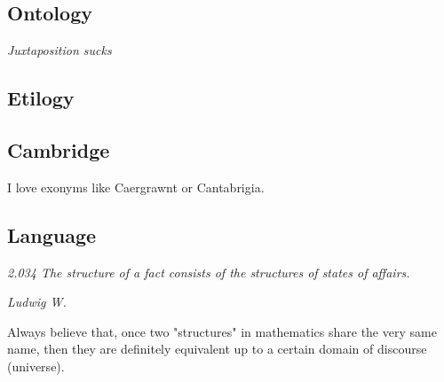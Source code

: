 \subsection{Ontology}
\epigraph{\footnotesize \textit{Juxtaposition sucks}}{}


\subsection{Etilogy}

\subsection{Cambridge}
I love exonyms like Caergrawnt or Cantabrigia. \\

\subsection{Language}
\epigraph{\footnotesize \textit{2.034 The structure of a fact consists of the structures of states of affairs.}}{\footnotesize \textit{Ludwig W.}}
Always believe that, once two "structures" in mathematics share the very same name, then they are definitely equivalent up to a certain domain of discourse (universe).